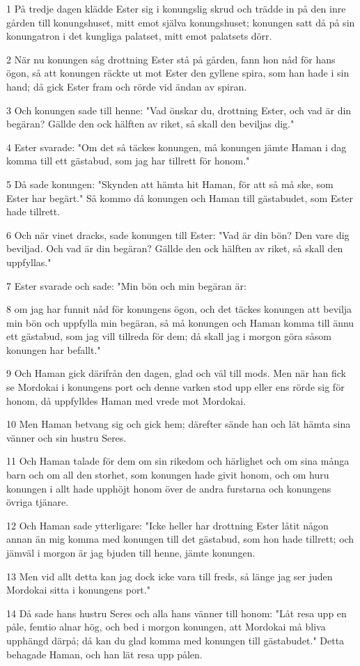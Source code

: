 \par 1 På tredje dagen klädde Ester sig i konungslig skrud och trädde in på den inre gården till konungshuset, mitt emot själva konungshuset; konungen satt då på sin konungatron i det kungliga palatset, mitt emot palatsets dörr.
\par 2 När nu konungen såg drottning Ester stå på gården, fann hon nåd för hans ögon, så att konungen räckte ut mot Ester den gyllene spira, som han hade i sin hand; då gick Ester fram och rörde vid ändan av spiran.
\par 3 Och konungen sade till henne: "Vad önskar du, drottning Ester, och vad är din begäran? Gällde den ock hälften av riket, så skall den beviljas dig."
\par 4 Ester svarade: "Om det så täckes konungen, må konungen jämte Haman i dag komma till ett gästabud, som jag har tillrett för honom."
\par 5 Då sade konungen: "Skynden att hämta hit Haman, för att så må ske, som Ester har begärt." Så kommo då konungen och Haman till gästabudet, som Ester hade tillrett.
\par 6 Och när vinet dracks, sade konungen till Ester: "Vad är din bön? Den vare dig beviljad. Och vad är din begäran? Gällde den ock hälften av riket, så skall den uppfyllas."
\par 7 Ester svarade och sade: "Min bön och min begäran är:
\par 8 om jag har funnit nåd för konungens ögon, och det täckes konungen att bevilja min bön och uppfylla min begäran, så må konungen och Haman komma till ännu ett gästabud, som jag vill tillreda för dem; då skall jag i morgon göra såsom konungen har befallt."
\par 9 Och Haman gick därifrån den dagen, glad och väl till mods. Men när han fick se Mordokai i konungens port och denne varken stod upp eller ens rörde sig för honom, då uppfylldes Haman med vrede mot Mordokai.
\par 10 Men Haman betvang sig och gick hem; därefter sände han och lät hämta sina vänner och sin hustru Seres.
\par 11 Och Haman talade för dem om sin rikedom och härlighet och om sina många barn och om all den storhet, som konungen hade givit honom, och om huru konungen i allt hade upphöjt honom över de andra furstarna och konungens övriga tjänare.
\par 12 Och Haman sade ytterligare: "Icke heller har drottning Ester låtit någon annan än mig komma med konungen till det gästabud, som hon hade tillrett; och jämväl i morgon är jag bjuden till henne, jämte konungen.
\par 13 Men vid allt detta kan jag dock icke vara till freds, så länge jag ser juden Mordokai sitta i konungens port."
\par 14 Då sade hans hustru Seres och alla hans vänner till honom: "Låt resa upp en påle, femtio alnar hög, och bed i morgon konungen, att Mordokai må bliva upphängd därpå; då kan du glad komma med konungen till gästabudet." Detta behagade Haman, och han lät resa upp pålen.

